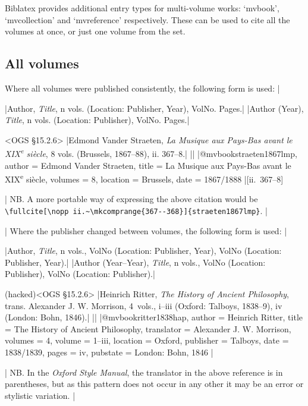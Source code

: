 \documentclass[extrafontsizes,11pt,a4paper,oneside]{memoir}
\newcommand*{\lit}[1]{\textsf{#1}}
\newcommand*{\code}[1]{`\textsf{#1}'}
\begin{document}
Biblatex provides additional entry types for multi-volume works: \code{mvbook}, \code{mvcollection} and \code{mvreference} respectively. These can be used to cite all the volumes at once, or just one volume from the set.

\subsection{All volumes}

Where all volumes were published consistently, the following form is used:
|

\specs
|Author, \emph{Title}, n \lit{vols.} (Location: Publisher, Year), VolNo. Pages.|%
|Author (Year), \emph{Title}, n \lit{vols.} (Location: Publisher), VolNo. Pages.|

\bibexample<OGS \S15.2.6>
|Edmond Vander Straeten, \emph{La Musique aux Pays-Bas avant le XIX\textsuperscript{e} siècle}, 8 vols. (Brussels, 1867--88), ii. 367--8.|
||%
|@mvbook{straeten1867lmp,
    author = {Edmond {Vander Straeten}},
    title = {La Musique aux Pays-Bas avant le XIX\textsuperscript{e} siècle},
    volumes = {8},
    location = {Brussels},
    date = {1867/1888}
}|[ii.~367--8]

\todoc[oxnotes]|
NB. A more portable way of expressing the above citation would be\\
\lstinline!\fullcite[\nopp ii.~\mkcomprange{367--368}]{straeten1867lmp}!.
|

\todoc|
Where the publisher changed between volumes, the following form is used:
|

\specs
|Author, \emph{Title}, n \lit{vols.}, VolNo (Location: Publisher, Year), VolNo (Location: Publisher, Year).|%
|Author (Year–Year), \emph{Title}, n \lit{vols.}, VolNo (Location: Publisher), VolNo (Location: Publisher).|

\bibexample(hacked)<OGS \S15.2.6>
|Heinrich Ritter, \emph{The History of Ancient Philosophy}, trans. Alexander J. W. Morrison, 4~vols., i--iii (Oxford: Talboys, 1838--9), iv (London: Bohn, 1846).|%
||%
|@mvbook{ritter1838hap,
  author = {Heinrich Ritter},
  title = {The History of Ancient Philosophy},
  translator = {Alexander J. W. Morrison},
  volumes = {4},
  volume = {1--iii},
  location = {Oxford},
  publisher = {Talboys},
  date = {1838/1839},
  pages = {iv},
  pubstate = {London: Bohn, 1846}
}|

\todoc[oxnotes]|
NB. In the \emph{Oxford Style Manual}, the translator in the above reference is in parentheses,
but as this pattern does not occur in any other it may be an error or stylistic variation.
|
\end{document}
